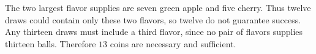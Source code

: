 The two largest flavor supplies are seven green apple and five cherry. Thus twelve draws could contain only these two flavors, so twelve do not guarantee success. Any thirteen draws must include a third flavor, since no pair of flavors supplies thirteen balls. Therefore $\boxed{13}$ coins are necessary and sufficient.
